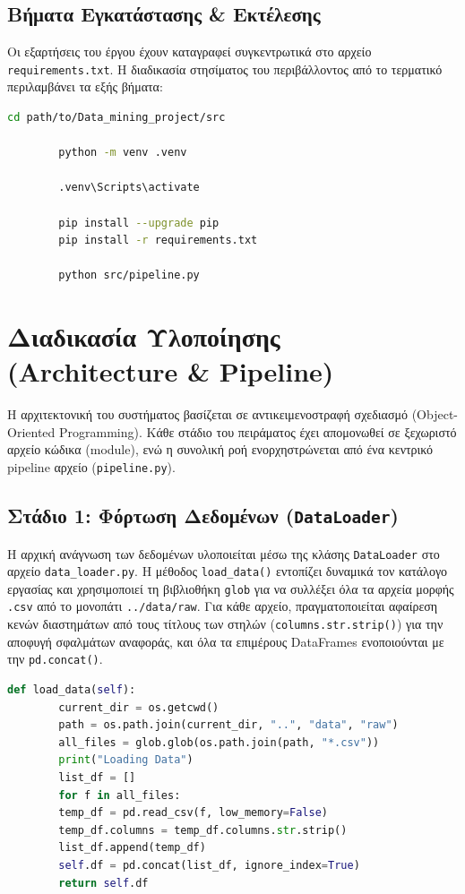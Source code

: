 \documentclass[11pt,a4paper]{article}
\begin{document}
	\subsection{Βήματα Εγκατάστασης \& Εκτέλεσης}
	Οι εξαρτήσεις του έργου έχουν καταγραφεί συγκεντρωτικά στο αρχείο \texttt{requirements.txt}. Η διαδικασία στησίματος του περιβάλλοντος από το τερματικό περιλαμβάνει τα εξής βήματα:
	
	\begin{lstlisting}[language=bash, caption={Εντολές Εγκατάστασης και Εκτέλεσης Pipeline}]
		cd path/to/Data_mining_project/src
		
		python -m venv .venv
		
		.venv\Scripts\activate
		
		pip install --upgrade pip
		pip install -r requirements.txt
		
		python src/pipeline.py
	\end{lstlisting}
	
	\newpage
	\section{Διαδικασία Υλοποίησης (Architecture \& Pipeline)}
	Η αρχιτεκτονική του συστήματος βασίζεται σε αντικειμενοστραφή σχεδιασμό (Object-Oriented Programming). Κάθε στάδιο του πειράματος έχει απομονωθεί σε ξεχωριστό αρχείο κώδικα (module), ενώ η συνολική ροή ενορχηστρώνεται από ένα κεντρικό pipeline αρχείο (\texttt{pipeline.py}).
	
	\subsection{Στάδιο 1: Φόρτωση Δεδομένων (\texttt{DataLoader})}
	Η αρχική ανάγνωση των δεδομένων υλοποιείται μέσω της κλάσης \texttt{DataLoader} στο αρχείο \texttt{data\_loader.py}. Η μέθοδος \texttt{load\_data()} εντοπίζει δυναμικά τον κατάλογο εργασίας και χρησιμοποιεί τη βιβλιοθήκη \texttt{glob} για να συλλέξει όλα τα αρχεία μορφής \texttt{.csv} από το μονοπάτι \texttt{../data/raw}. Για κάθε αρχείο, πραγματοποιείται αφαίρεση κενών διαστημάτων από τους τίτλους των στηλών (\texttt{columns.str.strip()}) για την αποφυγή σφαλμάτων αναφοράς, και όλα τα επιμέρους DataFrames ενοποιούνται με την \texttt{pd.concat()}.
	
	\begin{lstlisting}[language=Python, caption={Υλοποίηση Φόρτωσης Δεδομένων στην DataLoader}]
		def load_data(self):
		current_dir = os.getcwd()
		path = os.path.join(current_dir, "..", "data", "raw")
		all_files = glob.glob(os.path.join(path, "*.csv"))
		print("Loading Data")
		list_df = []
		for f in all_files:
		temp_df = pd.read_csv(f, low_memory=False)
		temp_df.columns = temp_df.columns.str.strip()
		list_df.append(temp_df)
		self.df = pd.concat(list_df, ignore_index=True)
		return self.df
	\end{lstlisting}
	
\end{document}
